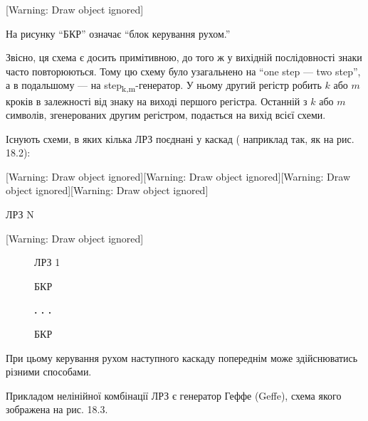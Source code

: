 [Warning: Draw object ignored]

На рисунку “БКР” означає “блок керування рухом.”

Звісно, ця схема є досить примітивною, до того ж у вихідній послідовності знаки
часто повторюються. Тому цю схему було узагальнено на “one step --- two step”, а
в подальшому --- на 
step\textsubscript{k}\textsubscript{,}\textsubscript{m}{}-генератор. У ньому
другий регістр робить  ${k}$ або  ${m}$ кроків в залежності від знаку на виході
першого регістра. Останній з  ${k}$ або  ${m}$ символів, згенерованих другим
регістром, подається на вихід всієї схеми.

Існують схеми, в яких кілька ЛРЗ поєднані у каскад ( наприклад так, як на рис.
18.2):


\bigskip

[Warning: Draw object ignored][Warning: Draw object ignored][Warning: Draw
object ignored][Warning: Draw object ignored]\begin{minipage}{1.0098in}

\bigskip
\end{minipage}\begin{minipage}{1.0091in}
 ЛРЗ N
\end{minipage}[Warning: Draw object ignored]

\begin{figure}
\centering
\begin{minipage}{1.0098in}
 ЛРЗ 1
\end{minipage}
\end{figure}
\begin{figure}
\centering
\begin{minipage}{0.5299in}
БКР
\end{minipage}
\end{figure}
\begin{figure}
\centering
\begin{minipage}{0.5083in}
{\bfseries
. . .}
\end{minipage}
\end{figure}
\begin{figure}
\centering
\begin{minipage}{0.5299in}
БКР
\end{minipage}
\end{figure}
При цьому керування рухом наступного каскаду попереднім може здійснюватись
різними способами. 

Прикладом нелінійної комбінації ЛРЗ є генератор Геффе (Geffe), схема якого
зображена на рис. 18.3. 


